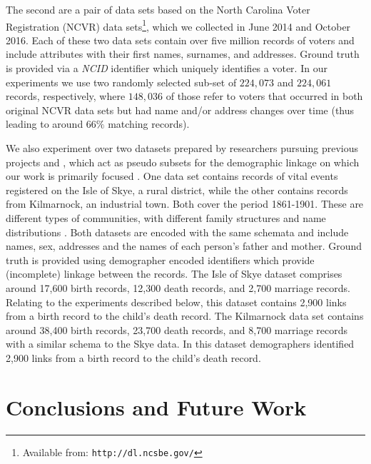 \documentclass{llncs}
\begin{document}
The second are a pair of data sets based on the North Carolina Voter
Registration (NCVR) data sets\footnote{Available from: \texttt{http://dl.ncsbe.gov/}}, which we collected in June 2014 and
October 2016. Each of these two data sets contain over five million
records of voters and include attributes with their first names,
surnames, and addresses. Ground truth is provided via a \emph{NCID}
identifier which uniquely identifies a voter. In our experiments we
use two randomly selected sub-set of $224,073$ and $224,061$ records,
respectively, where $148,036$ of those refer to voters that occurred
in both original NCVR data sets but had name and/or address changes
over time (thus leading to around $66\%$ matching records).


We also experiment over two datasets prepared by researchers pursuing previous projects \cite{reid2002} and \cite{reid2006}, which act as pseudo subsets for the demographic linkage on which our work is primarily focused . One data set contains records of vital events registered on the Isle of Skye, a rural district, while the other contains records from Kilmarnock, an industrial town. Both cover the period 1861-1901. These are different types of communities, with different family structures and name distributions \cite{reid2002}. Both datasets are encoded with the same schemata and include names, sex, addresses and the names of each person's father and mother. Ground truth is provided using demographer encoded identifiers which provide (incomplete) linkage between the records.  The Isle of Skye dataset comprises around 17,600 birth records, 12,300 death records, and 2,700 marriage records. Relating to the experiments described below, this dataset contains 2,900 links from a birth record to the child's death record. The Kilmarnock data set contains around 38,400 birth records, 23,700 death records, and 8,700 marriage records with a similar schema to the Skye data. In this dataset demographers identified  2,900 links from a birth record to the child's death record.


\section{Conclusions and Future Work}
\label{sec-concl}



 
\end{document}
